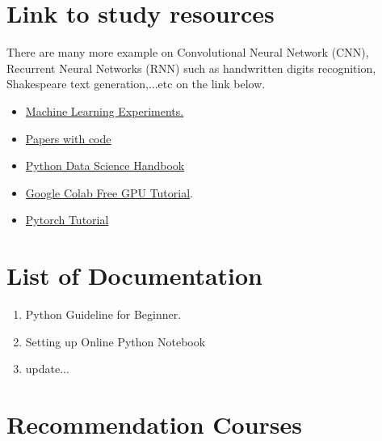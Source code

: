 \documentclass[a4paper,10pt]{article}
\begin{document}

\section{Link to study resources}
There are many more example on Convolutional Neural Network (CNN), Recurrent Neural Networks (RNN) such as handwritten digits recognition, Shakespeare text generation,...etc on the link below.

\begin{itemize}
  \item \href{https://github.com/trekhleb/machine-learning-experiments}{Machine Learning Experiments.}
  \item \href{https://paperswithcode.com/}{Papers with code}
  \item \href{https://github.com/jakevdp/PythonDataScienceHandbook}{Python Data Science Handbook}
  \item \href{https://medium.com/deep-learning-turkey/google-colab-free-gpu-tutorial-e113627b9f5d}{Google Colab Free GPU Tutorial}.
  \item \href{https://pytorch.org/tutorials/beginner/nn_tutorial.html}{Pytorch Tutorial}

\end{itemize}




\section{List of Documentation}

\begin{enumerate}
  \item Python Guideline for Beginner.
  \item Setting up Online Python Notebook
  \item update...
\end{enumerate}

\vspace{1cm}
\vspace{1cm}





\section{Recommendation Courses}
\end{document}
